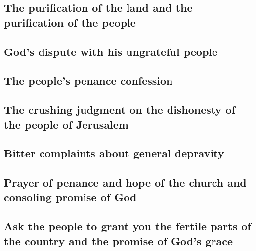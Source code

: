 \hypertarget{the-purification-of-the-land-and-the-purification-of-the-people}{%
\subsection{The purification of the land and the purification of the
people}\label{the-purification-of-the-land-and-the-purification-of-the-people}}

\hypertarget{gods-dispute-with-his-ungrateful-people}{%
\subsection{God's dispute with his ungrateful
people}\label{gods-dispute-with-his-ungrateful-people}}

\hypertarget{the-peoples-penance-confession}{%
\subsection{The people's penance
confession}\label{the-peoples-penance-confession}}

\hypertarget{the-crushing-judgment-on-the-dishonesty-of-the-people-of-jerusalem}{%
\subsection{The crushing judgment on the dishonesty of the people of
Jerusalem}\label{the-crushing-judgment-on-the-dishonesty-of-the-people-of-jerusalem}}

\hypertarget{bitter-complaints-about-general-depravity}{%
\subsection{Bitter complaints about general
depravity}\label{bitter-complaints-about-general-depravity}}

\hypertarget{prayer-of-penance-and-hope-of-the-church-and-consoling-promise-of-god}{%
\subsection{Prayer of penance and hope of the church and consoling
promise of
God}\label{prayer-of-penance-and-hope-of-the-church-and-consoling-promise-of-god}}

\hypertarget{ask-the-people-to-grant-you-the-fertile-parts-of-the-country-and-the-promise-of-gods-grace}{%
\subsection{Ask the people to grant you the fertile parts of the country
and the promise of God's
grace}\label{ask-the-people-to-grant-you-the-fertile-parts-of-the-country-and-the-promise-of-gods-grace}}

